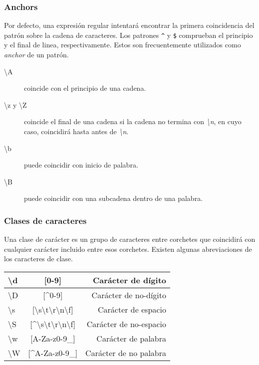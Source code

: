 \subsubsection{Anchors}
Por defecto, una expresión regular intentará encontrar la primera coincidencia del patrón sobre la cadena de caracteres. Los patrones \texttt{\textasciicircum{}} y \texttt{\$} comprueban el principio y el final de linea, respectivamente. Estos son frecuentemente utilizados como \textit{anchor} de un patrón.
\begin{description}
	\item[\textbackslash{}A] coincide con el principio de una cadena.
	\item[\textbackslash{}z y \textbackslash{}Z] coincide el final de una cadena si la cadena no termina con \textit{\textbackslash{}n}, en cuyo caso, coincidirá hasta antes de \textit{\textbackslash{}n}.
	\item[\textbackslash{}b] puede coincidir con inicio de palabra.
	\item[\textbackslash{}B] puede coincidir con una subcadena dentro de una palabra. 
\end{description}

\subsubsection{Clases de caracteres}
Una clase de carácter es un grupo de caracteres entre corchetes que coincidirá con cualquier carácter incluido entre esos corchetes. Existen algunas abreviaciones de los caracteres de clase.

\begin{center}
	\begin{tabular}{| l | c | r |}
		\hline
		\textbackslash{}d & [0-9] & Carácter de dígito \\ \hline
		\textbackslash{}D & [\textasciicircum{}0-9] & Carácter de no-dígito \\ \hline
		\textbackslash{}s & [\textbackslash{}s\textbackslash{}t\textbackslash{}r\textbackslash{}n\textbackslash{}f] & Carácter de espacio \\ \hline
		\textbackslash{}S & [\textasciicircum{}\textbackslash{}s\textbackslash{}t\textbackslash{}r\textbackslash{}n\textbackslash{}f] & Carácter de no-espacio \\ \hline
		\textbackslash{}w & [A-Za-z0-9\_] & Carácter de palabra \\ \hline
		\textbackslash{}W & [\textasciicircum{}A-Za-z0-9\_] & Carácter de no palabra \\
		\hline
	\end{tabular}
\end{center}

